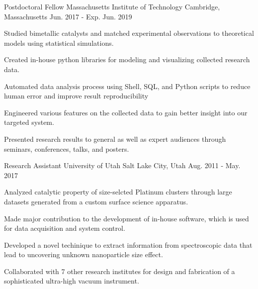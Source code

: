 


\begin{cventries}


\cventry
{Postdoctoral Fellow}
{Massachusetts Institute of Technology}
{Cambridge, Massachusetts}
{Jun. 2017 - Exp. Jun. 2019}
{
\begin{cvitems}
\item {Studied bimetallic catalysts and matched experimental observations to
    theoretical models using statistical simulations.}
\item {Created in-house python libraries for modeling and visualizing collected
    research data.}
\item {Automated data analysis process using Shell, SQL, and Python scripts to
    reduce human error and improve result reproducibility}
\item {Engineered various features on the collected data to gain better insight
    into our targeted system.}
\item {Presented research results to general as well as expert audiences
    through seminars, conferences, talks, and posters.}
\end{cvitems}
}


\cventry
{Research Assistant}
{University of Utah}
{Salt Lake City, Utah}
{Aug. 2011 - May. 2017}
{
\begin{cvitems}
\item {Analyzed catalytic property of size-selcted Platinum clusters through  
    large datasets generated from a custom surface science apparatus.}
\item {Made major contribution to the development of in-house software, which is used
    for data acquisition and system control.}
\item {Developed a novel techinique to extract information from spectroscopic
    data that lead to uncovering unknown nanoparticle size effect.}
\item {Collaborated with 7 other research institutes for design and fabrication
    of a sophisticated ultra-high vacuum instrument.}
\end{cvitems}
}


\end{cventries}